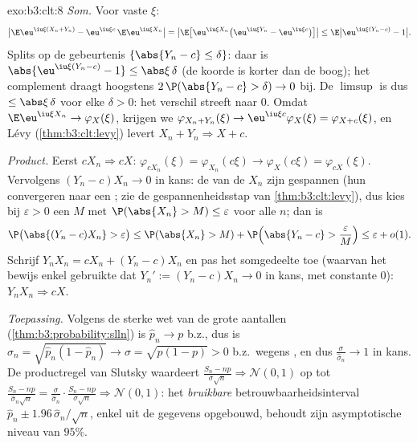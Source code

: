 \begin{solution}{exo:b3:clt:8}
\emph{Som.} Voor vaste $\xi$:
\[
\bigl|\E\eu^{\iu\xi(X_n+Y_n)} -
\eu^{\iu\xi c}\,\E\eu^{\iu\xi X_n}\bigr|
= \bigl|\E\bigl[\eu^{\iu\xi X_n}\bigl(\eu^{\iu\xi Y_n} -
\eu^{\iu\xi c}\bigr)\bigr]\bigr|
\leq \E\bigl|\eu^{\iu\xi(Y_n - c)} - 1\bigr| .
\]
Splits op de gebeurtenis $\{\abs{Y_n - c} \leq \delta\}$:
daar is $\abs{\eu^{\iu\xi(Y_n-c)} - 1} \leq
\abs\xi\,\delta$ (de koorde is korter dan de boog); het
complement draagt hoogstens $2\,\P(\abs{Y_n - c} > \delta)
\to 0$ bij. De $\limsup$ is dus $\leq \abs\xi\,\delta$ voor
elke $\delta > 0$: het verschil streeft naar $0$. Omdat
$\E\eu^{\iu\xi X_n} \to \varphi_X(\xi)$, krijgen we
$\varphi_{X_n+Y_n}(\xi) \to \eu^{\iu\xi c}\varphi_X(\xi) =
\varphi_{X+c}(\xi)$, en Lévy
(\cref{thm:b3:clt:levy}) levert $X_n + Y_n \Rightarrow X +
c$.

\emph{Product.} Eerst $cX_n \Rightarrow cX$:
$\varphi_{cX_n}(\xi) = \varphi_{X_n}(c\xi) \to
\varphi_X(c\xi) = \varphi_{cX}(\xi)$. Vervolgens $(Y_n -
c)X_n \to 0$ in kans: de  van de $X_n$ zijn
gespannen (hun  convergeren naar
een ; zie de
gespannenheidsstap van \cref{thm:b3:clt:levy}), dus kies
bij $\varepsilon > 0$ een $M$ met $\P(\abs{X_n} > M) \leq
\varepsilon$ voor alle $n$; dan is
\[
\P\bigl(\abs{(Y_n - c)X_n} > \varepsilon\bigr) \leq
\P(\abs{X_n} > M) + \P\Bigl(\abs{Y_n - c} >
\frac{\varepsilon}{M}\Bigr) \leq \varepsilon + o(1) .
\]
Schrijf $Y_nX_n = cX_n + (Y_n - c)X_n$ en pas het
somgedeelte toe (waarvan het bewijs enkel gebruikte dat
$Y_n' := (Y_n - c)X_n \to 0$ in kans, met constante $0$):
$Y_nX_n \Rightarrow cX$.

\emph{Toepassing.} Volgens de sterke wet van de grote
aantallen (\cref{thm:b3:probability:slln}) is $\hat p_n \to
p$ b.z., dus is $\hat\sigma_n = \sqrt{\hat p_n(1 - \hat
p_n)} \to \sigma = \sqrt{p(1 - p)} > 0$ b.z.\ wegens
, en dus $\frac{\sigma}{\hat\sigma_n} \to 1$ in
kans. De productregel van Slutsky waardeert $\frac{S_n -
np}{\sigma\sqrt n} \Rightarrow \mathcal N(0,1)$ op tot
$\frac{S_n - np}{\hat\sigma_n\sqrt n} =
\frac{\sigma}{\hat\sigma_n}\cdot \frac{S_n - np}{\sigma\sqrt
n} \Rightarrow \mathcal N(0,1)$: het \emph{bruikbare}
betrouwbaarheidsinterval $\hat p_n \pm
1.96\,\hat\sigma_n/\sqrt n$, enkel uit de gegevens
opgebouwd, behoudt zijn asymptotische niveau van $95\%$.
\end{solution}

